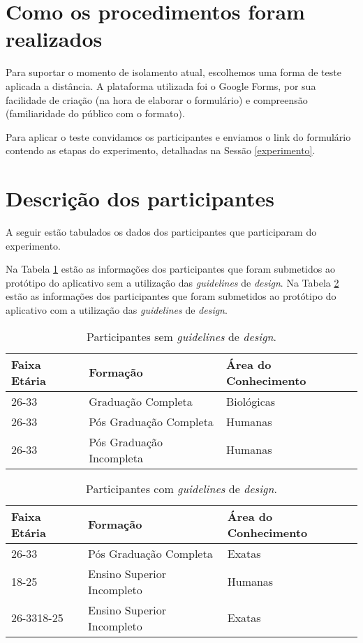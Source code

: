 \documentclass[12pt]{article}
\begin{document}
\section{Como os procedimentos foram realizados}

Para suportar o momento de isolamento atual, escolhemos uma forma de teste aplicada a distância. A plataforma utilizada foi o Google Forms, por sua facilidade de criação (na hora de elaborar o formulário) e compreensão (familiaridade do público com o formato).

Para aplicar o teste convidamos os participantes e enviamos o link do formulário contendo as etapas do experimento, detalhadas na Sessão \ref{experimento}.

\section{Descrição dos participantes}

A seguir estão tabulados os dados dos participantes que participaram do experimento.

Na Tabela \ref{tab:no_guidelines} estão as informações dos participantes que foram submetidos ao protótipo do aplicativo sem a utilização das \textit{guidelines} de \textit{design}. Na Tabela \ref{tab:guidelines} estão as informações dos participantes que foram submetidos ao protótipo do aplicativo com a utilização das \textit{guidelines} de \textit{design}.

\begin{table}[!htb]
  \centering
	\begin{tabular}{|l|l|l|}
		\hline
		\textbf{Faixa Etária} & \textbf{Formação} & \textbf{Área do Conhecimento} \\ \hline
		26-33 & Graduação Completa & Biológicas \\ \hline
		26-33 & Pós Graduação Completa & Humanas \\ \hline
		26-33 & Pós Graduação Incompleta & Humanas \\ \hline
		\end{tabular}
  \caption{Participantes sem \textit{guidelines} de \textit{design}.}
  \label{tab:no_guidelines}
\end{table}

\begin{table}[!htb]
  \centering
	\begin{tabular}{|l|l|l|}
		\hline
		\textbf{Faixa Etária} & \textbf{Formação} & \textbf{Área do Conhecimento} \\ \hline
		26-33 & Pós Graduação Completa & Exatas \\ \hline
		18-25 & Ensino Superior Incompleto & Humanas \\ \hline
		26-3318-25 & Ensino Superior Incompleto & Exatas \\ \hline
		\end{tabular}
  \caption{Participantes com \textit{guidelines} de \textit{design}.}
  \label{tab:guidelines}
\end{table}
\end{document}
